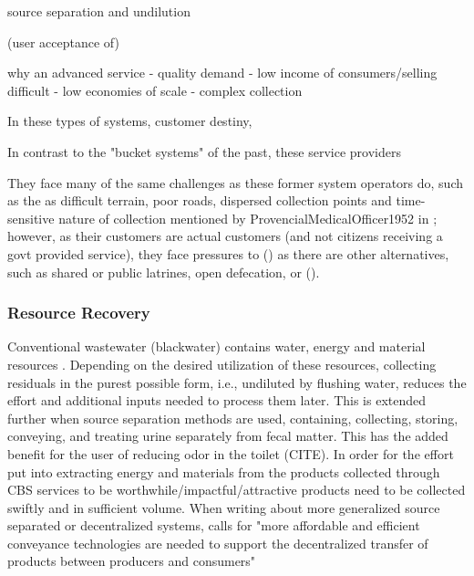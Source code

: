 \documentclass[sustainability,article,submit,moreauthors,pdftex,10pt,a4paper]{mdpi}
\theoremstyle{mdpi}
\newcounter{ex}
\newcounter{re}
\theoremstyle{mdpidefinition}
\begin{document}





 
 source separation and undilution
 
(user acceptance of)


why an advanced service
- quality demand
- low income of consumers/selling difficult
- low economies of scale
-  complex collection

In these types of systems, customer destiny, \cite{Schmitt2017}

In contrast to the "bucket systems" of the past, these service providers 

They face many of the same challenges as these former system operators do, such as the as difficult terrain, poor roads, dispersed collection points and time-sensitive nature of collection mentioned by ProvencialMedicalOfficer1952 in \cite{Nyanchaga2007}; however, as their customers are actual customers (and not citizens receiving a govt provided service), they face pressures to () as there are other alternatives, such as shared or public latrines, open defecation, or (). %


\subsubsection{Resource Recovery}

Conventional wastewater (blackwater) contains  water, energy and material resources \cite{Guest2009}. Depending on the desired utilization of these resources, collecting residuals in the purest possible form, i.e., undiluted by flushing water, reduces the effort and additional inputs needed to process them later. This is extended further when source separation methods are used, containing, collecting, storing, conveying, and treating urine separately from fecal matter. This has the added benefit for the user of reducing odor in the toilet (CITE). In order for the effort put into extracting energy and materials from the products collected through CBS services to be worthwhile/impactful/attractive products need to be collected swiftly and in sufficient volume. When writing about more generalized source separated or decentralized systems, \cite{Tilley2013} calls for "more affordable and efficient conveyance technologies are needed to support the decentralized transfer of products between producers and consumers"
\end{document}
